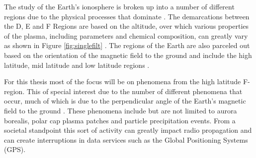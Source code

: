 %
% 
%

The study of the Earth's ionosphere is broken up into a number of different regions due to the physical processes that dominate \cite{kellybook}. The demarcations between the D, E and F Regions are based on the altitude, over which various properties of the plasma, including parameters and chemical composition, can greatly vary as shown in Figure \ref{fig:singlefilt} \cite{kellybook}. The regions of the Earth are also parceled out based on the orientation of the magnetic field to the ground and include the high latitude, mid latitude and low latitude regions \cite{schunk2004ionospheres}.

For this thesis most of the focus will be on phenomena from the high latitude F-region. This of special interest due to the number of different phenomena that occur, much of which is due to the perpendicular angle of the Earth's magnetic field to the ground \cite{schunk2004ionospheres}. These phenomena include but are not limited to aurora borealis, polar cap plasma patches and particle precipitation events\cite{Perry:2015jf,Dahlgren:2013ip,dahlgren2012di,Dahlgren:2012dq,semeter:plasmatransport2012}. From a societal standpoint this sort of activity can greatly impact radio propagation and can create interruptions in data services such as the Global Positioning Systems (GPS)\cite{Jiao:2013ei,hunsucker2007high}.



